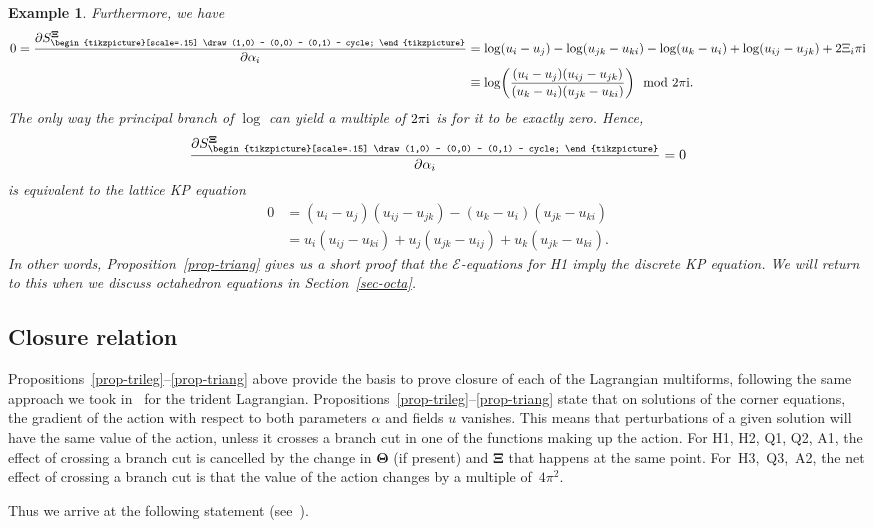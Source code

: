 \documentclass[pdftex]{sigma}
\newcommand{\triang}{{\begin{tikzpicture}[scale=.15]
			\draw (1,0) -- (0,0) -- (0,1) -- cycle;
\end{tikzpicture}}}
\newcommand{\pdv}[2]{\frac{\partial {#1}}{\partial {#2}}}
\renewcommand{\vec}{\boldsymbol}
\newtheorem{Example}[Definition]{Example}
\numberwithin{equation}{section}
\begin{document}
\begin{Example}
Furthermore, we have
\begin{align*}
 0 = \pdv{S_\triang^{\vec \Xi}}{\alpha_i} &= \log(u_i-u_j) - \log(u_{jk}-u_{ki}) - \log(u_k-u_i) + \log(u_{ij}-u_{jk}) + 2 \Xi_i \pi {\rm i}\\
 &\equiv \log \biggl( \frac{(u_i-u_j)(u_{ij}-u_{jk})}{(u_k-u_i)(u_{jk}-u_{ki})} \biggr) \mod 2 \pi {\rm i} .
\end{align*}
The only way the principal branch of $\log$ can yield a multiple of $2 \pi {\rm i}$ is for it to be exactly zero. Hence,
\[
\pdv{S_\triang^{\vec \Xi}}{\alpha_i} = 0
\]
 is equivalent to the lattice KP equation~\cite{nijhoff1984backlund}
\begin{align*}
 0 &= (u_i-u_j)(u_{ij}-u_{jk}) - (u_k-u_i)(u_{jk}-u_{ki}) \\
 &= u_i(u_{ij}-u_{ki}) + u_j(u_{jk}-u_{ij}) + u_k(u_{jk}-u_{ki}) .
\end{align*}
In other words, Proposition~\ref{prop-triang} gives us a short proof that the $\mathcal{E}$-equations for H1 imply the discrete KP equation. We will return to this when we discuss octahedron equations in Section~\ref{sec-octa}.
\end{Example}

\subsection{Closure relation}

Propositions~\ref{prop-trileg}--\ref{prop-triang} above provide the basis to prove closure of each of the Lagrangian multiforms, following the same approach we took in~\cite{richardson2025discrete1} for the trident Lagrangian. Propositions~\mbox{\ref{prop-trileg}--\ref{prop-triang}} state that on solutions of the corner equations, the gradient of the action with respect to both parameters $\alpha$ and fields $u$ vanishes. This means that perturbations of a given solution will have the same value of the action, unless it crosses a branch cut in one of the functions making up the action. For H1, H2, Q1, Q2, A1, the effect of crossing a branch cut is cancelled by the change in $\vec \Theta$ (if present) and $\vec \Xi$ that happens at the same point. For~H3,~Q3,~A2, the net effect of crossing a branch cut is that the value of the action changes by a multiple of~$4 \pi^2$.

Thus we arrive at the following statement (see~\cite[Theorem~3.5]{richardson2025discrete1}).
\end{document}
